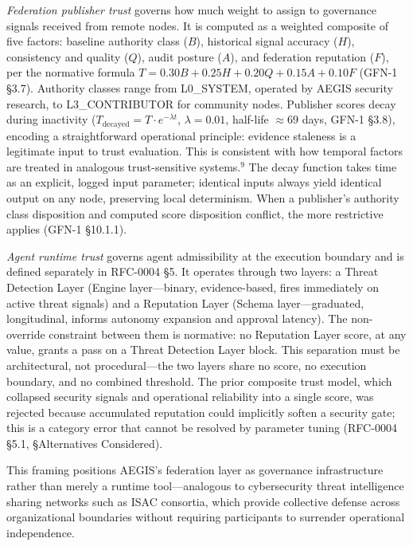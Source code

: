 \documentclass{IEEEcsmag}
\begin{document}
{\it Federation publisher trust} governs how much weight to assign to governance signals received from remote nodes. It is computed as a weighted composite of five factors: baseline authority class ($B$), historical signal accuracy ($H$), consistency and quality ($Q$), audit posture ($A$), and federation reputation ($F$), per the normative formula $T = 0.30B + 0.25H + 0.20Q + 0.15A + 0.10F$ (GFN-1 \S3.7). Authority classes range from L0\_SYSTEM, operated by AEGIS security research, to L3\_CONTRIBUTOR for community nodes. Publisher scores decay during inactivity ($T_{\text{decayed}} = T \cdot e^{-\lambda t}$, $\lambda=0.01$, half-life $\approx$69 days, GFN-1 \S3.8), encoding a straightforward operational principle: evidence staleness is a legitimate input to trust evaluation. This is consistent with how temporal factors are treated in analogous trust-sensitive systems.$^{9}$ The decay function takes time as an explicit, logged input parameter; identical inputs always yield identical output on any node, preserving local determinism. When a publisher's authority class disposition and computed score disposition conflict, the more restrictive applies (GFN-1 \S10.1.1).

{\it Agent runtime trust} governs agent admissibility at the execution boundary and is defined separately in RFC-0004 \S5. It operates through two layers: a Threat Detection Layer (Engine layer---binary, evidence-based, fires immediately on active threat signals) and a Reputation Layer (Schema layer---graduated, longitudinal, informs autonomy expansion and approval latency). The non-override constraint between them is normative: no Reputation Layer score, at any value, grants a pass on a Threat Detection Layer block. This separation must be architectural, not procedural---the two layers share no score, no execution boundary, and no combined threshold. The prior composite trust model, which collapsed security signals and operational reliability into a single score, was rejected because accumulated reputation could implicitly soften a security gate; this is a category error that cannot be resolved by parameter tuning (RFC-0004 \S5.1, \S Alternatives Considered).

This framing positions AEGIS's federation layer as governance infrastructure rather than merely a runtime tool---analogous to cybersecurity threat intelligence sharing networks such as ISAC consortia, which provide collective defense across organizational boundaries without requiring participants to surrender operational independence.
\end{document}
